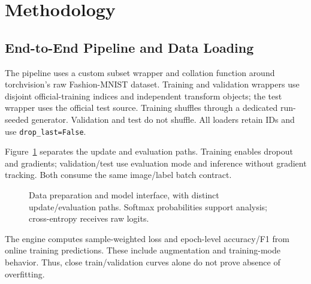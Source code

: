 \section{Methodology}
\label{sec:methods}
\subsection{End-to-End Pipeline and Data Loading}
The pipeline uses a custom subset wrapper and collation function around torchvision's
raw Fashion-MNIST dataset. Training and validation wrappers use disjoint official-training
indices and independent transform objects; the test wrapper uses the official test
source. Training shuffles through a dedicated run-seeded generator. Validation and
test do not shuffle. All loaders retain IDs and use \texttt{drop\_last=False}.

Figure~\ref{fig:pipeline} separates the update and evaluation paths. Training enables
dropout and gradients; validation/test use evaluation mode and inference without
gradient tracking. Both consume the same image/label batch contract.
\begin{figure}[H]\centering
{}
\caption{Data preparation and model interface, with distinct update/evaluation paths.
Softmax probabilities support analysis; cross-entropy receives raw logits.}
\label{fig:pipeline}
\end{figure}
The engine computes sample-weighted loss and epoch-level accuracy/F1 from online
training predictions. These include augmentation and training-mode behavior.
Thus, close train/validation curves alone do not prove absence of overfitting.

